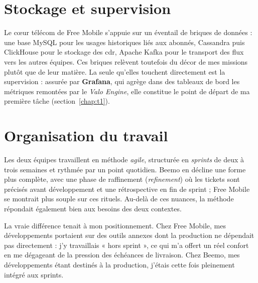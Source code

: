 \section{Stockage et supervision}
Le cœur télécom de Free Mobile s'appuie sur un éventail de briques de données :
une base MySQL pour les usages historiques liés aux abonnés, Cassandra puis
ClickHouse pour le stockage des \gls{cdr}, Apache Kafka pour le transport des
flux vers les autres équipes. Ces briques relèvent toutefois du décor de mes
missions plutôt que de leur matière. La seule qu'elles touchent directement est
la supervision : assurée par \textbf{Grafana}, qui agrège dans des tableaux de
bord les métriques remontées par le \emph{Valo Engine}, elle constitue le point
de départ de ma première tâche (section~\ref{chap:t1}).

\section{Organisation du travail}
Les deux équipes travaillent en méthode \emph{agile}, structurée en
\emph{sprints} de deux à trois semaines et rythmée par un point quotidien.
Beemo en décline une forme plus complète, avec une phase de raffinement
(\emph{refinement}) où les tickets sont précisés avant développement et une
rétrospective en fin de sprint ; Free Mobile se montrait plus souple sur ces
rituels. Au-delà de ces nuances, la méthode répondait également bien aux
besoins des deux contextes.

La vraie différence tenait à mon positionnement. Chez Free Mobile, mes
développements portaient sur des outils annexes dont la production ne dépendait
pas directement : j'y travaillais « hors sprint », ce qui m'a offert un réel
confort en me dégageant de la pression des échéances de livraison. Chez Beemo,
mes développements étant destinés à la production, j'étais cette
fois pleinement intégré aux sprints.
